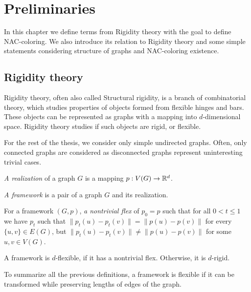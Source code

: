 
\chapter{Preliminaries}

\begin{chapterabstract}

	In this chapter we define terms from Rigidity theory with the goal to define
	NAC-coloring. We also introduce its relation to Rigidity theory and
	some simple statements considering
	structure of graphs and NAC-coloring existence.

\end{chapterabstract}

\section{Rigidity theory}

Rigidity theory, often also called Structural rigidity,
is a branch of combinatorial theory,
which studies properties of objects formed from flexible hinges and bars.
These objects can be represented as graphs with
a mapping into \( d \)-dimensional space.
Rigidity theory studies if such objects are rigid, or flexible.

For the rest of the thesis,
we consider only simple undirected graphs.
Often, only connected graphs are considered as disconnected graphs
represent uninteresting trivial cases.

%
\begin{definition}
	\emph{A realization} of a graph \( G \) is a mapping \( p: V(G) \to \mathbb{R}^d \).
\end{definition}
%
\begin{definition}
	\emph{A framework} is a pair of a graph \( G \) and its realization.
\end{definition}
%
\begin{definition}
	For a framework \( (G, p) \), \emph{a nontrivial flex} of
	\( p_0 = p \) such that for all \( 0 < t \le 1 \) we have \( p_t \) such that
	\( \|p_t(u) - p_t(v)\| = \|p(u) - p(v)\|\) for every \( \{u, v\} \in E(G) \),
	but \( \|p_t(u) - p_t(v)\| \ne \|p(u) - p(v)\| \) for some \( u, v \in V (G) \).
\end{definition}
%
\begin{definition}
	A framework is \( d \)-flexible, if it has a nontrivial flex.
	Otherwise, it is \( d \)-rigid.
\end{definition}
%
To summarize all the previous definitions,
a framework is flexible if it can be transformed while preserving lengths of
edges of the graph.

